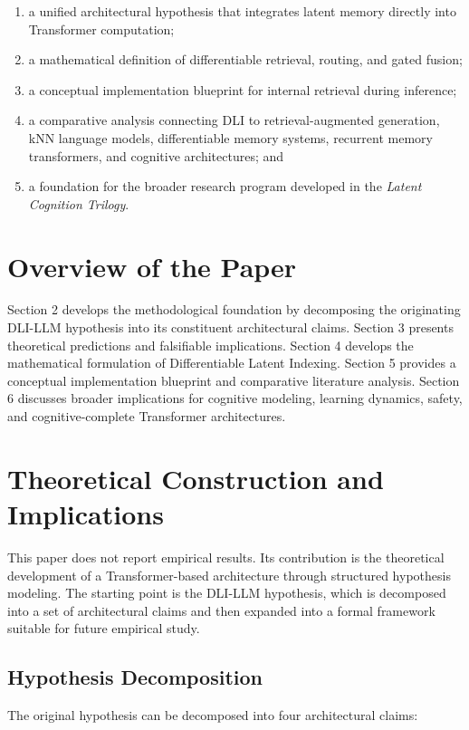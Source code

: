 \begin{enumerate}
    \item a unified architectural hypothesis that integrates latent memory directly into Transformer computation;
    \item a mathematical definition of differentiable retrieval, routing, and gated fusion;
    \item a conceptual implementation blueprint for internal retrieval during inference;
    \item a comparative analysis connecting DLI to retrieval-augmented generation, kNN language models, differentiable memory systems, recurrent memory transformers, and cognitive architectures; and
    \item a foundation for the broader research program developed in the \textit{Latent Cognition Trilogy}.
\end{enumerate}

\section{Overview of the Paper}
Section 2 develops the methodological foundation by decomposing the originating DLI-LLM hypothesis into its constituent architectural claims. Section 3 presents theoretical predictions and falsifiable implications. Section 4 develops the mathematical formulation of Differentiable Latent Indexing. Section 5 provides a conceptual implementation blueprint and comparative literature analysis. Section 6 discusses broader implications for cognitive modeling, learning dynamics, safety, and cognitive-complete Transformer architectures.

\section{Theoretical Construction and Implications}
This paper does not report empirical results. Its contribution is the theoretical development of a Transformer-based architecture through structured hypothesis modeling. The starting point is the DLI-LLM hypothesis, which is decomposed into a set of architectural claims and then expanded into a formal framework suitable for future empirical study.

\subsection{Hypothesis Decomposition}
The original hypothesis can be decomposed into four architectural claims:

